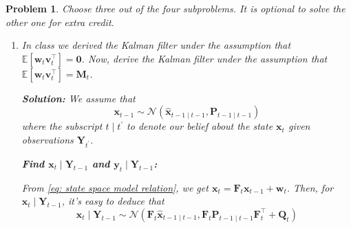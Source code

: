 \documentclass[11pt]{article}
\theoremstyle{plain} %
\newtheorem{problem}[theorem]{Problem}
\newenvironment{solution}
{\color{C2}\normalfont\begin{framed}\begingroup\textbf{Solution:} }
  {\endgroup\end{framed}}
\theoremstyle{remark}
\begin{document}
\begin{problem}
Choose three out of the four subproblems. It is optional to solve the other one
for extra credit.
\begin{enumerate}[label=(\alph*)]
  \item In class we derived the Kalman filter under the assumption that
        $\mathbb{E}\left[\mathbf{w}_t \mathbf{v}_t^\top\right]=\mathbf{0}$. Now,
        derive the Kalman filter under the assumption that
        $\mathbb{E}\left[\mathbf{w}_t \mathbf{v}_t^\top\right]=\mathbf{M}_t$.

        \begin{solution}
          We assume that
          $$
            \mathbf{x}_{t-1} \sim \mathcal{N}\left(\hat{\mathbf{x}}_{t-1 \mid t-1}, \mathbf{P}_{t-1 \mid t-1}\right)
          $$
          where the subscript $t \mid t^{\prime}$ to denote our belief about the state $\mathbf{x}_{t}$ given
          observations $\mathbf{Y}_{t^{\prime}}$.

          \textbf{Find $\mathbf{x}_{t} \mid \mathbf{Y}_{t-1}$ and $\mathbf{y}_{t} \mid \mathbf{Y}_{t-1}$:}

          From \cref{eq: state space model relation}, we get $\mathbf{x}_{t}=\mathbf{F}_{t} \mathbf{x}_{t-1}+\mathbf{w}_{t}$.
          Then, for $\mathbf{x}_{t} \mid \mathbf{Y}_{t-1}$, it's easy to deduce that
          $$
            \mathbf{x}_{t} \mid \mathbf{Y}_{t-1} \sim \mathcal{N}\left(\mathbf{F}_{t} \hat{\mathbf{x}}_{t-1 \mid t-1}, \mathbf{F}_{t} \mathbf{P}_{t-1 \mid t-1} \mathbf{F}_{t}^\top+\mathbf{Q}_{t}\right)
          $$


\end{solution}
\end{enumerate}
\end{problem}
\end{document}
